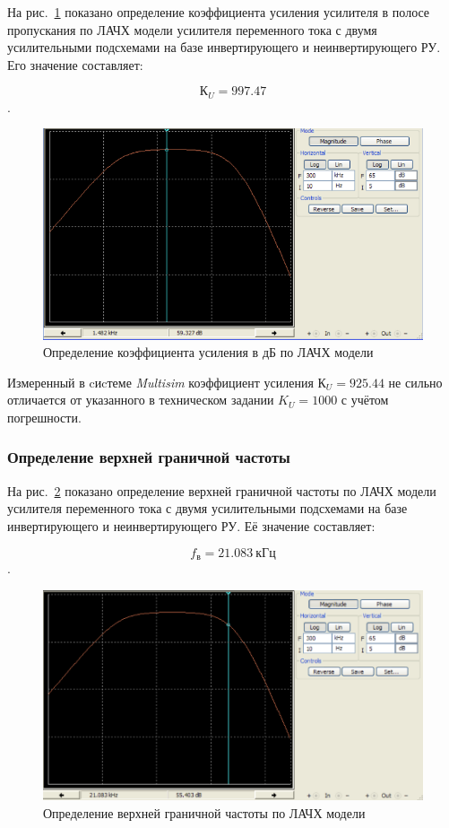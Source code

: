 На рис.~\ref{fig:plot_k_sub2_py} показано 
определение коэффициента усиления 
усилителя в полосе пропускания 
по ЛАЧХ модели
усилителя переменного тока
с двумя усилительными подсхемами
на базе инвертирующего и неинвертирующего РУ. 
Его значение составляет:

$$ К_U = 997.47 $$.

\begin{figure}[H]
	\centering
	\includegraphics[width=0.7\linewidth]{photo/plot_k_sub2_py}
	\caption{Определение коэффициента усиления в дБ по ЛАЧХ модели}
	\label{fig:plot_k_sub2_py}
\end{figure}

Измеренный в cиcтеме \textit{Multisim}
коэффициент усиления $ К_U = 925.44 $ 
не сильно отличается от указанного 
в техническом задании $ K_U = 1000 $
с учётом погрешности.

\subsubsection*{Определение верхней граничной частоты}

На рис.~\ref{fig:plot_f_high_sub2_py} показано 
определение верхней граничной частоты 
по ЛАЧХ модели
усилителя переменного тока
с двумя усилительными подсхемами
на базе инвертирующего и неинвертирующего РУ. 
Её значение составляет:

$$ f_в = 21.083~кГц $$.

\begin{figure}[H]
	\centering
	\includegraphics[width=0.7\linewidth]{photo/plot_f_high_sub2_py}
	\caption{Определение верхней граничной частоты по ЛАЧХ модели}
	\label{fig:plot_f_high_sub2_py}
\end{figure}

